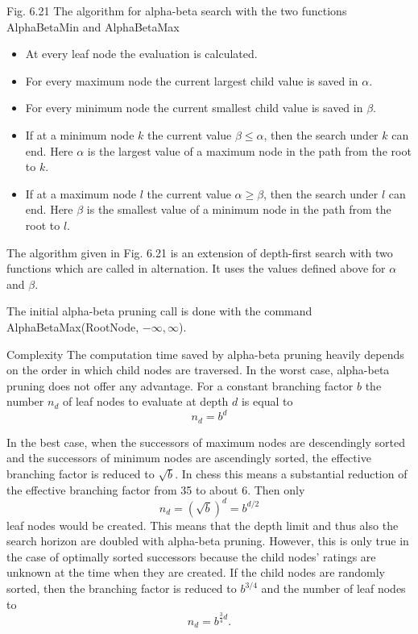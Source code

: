 \documentclass[10pt]{book}
\begin{document}
Fig. 6.21 The algorithm for alpha-beta search with the two functions AlphaBetaMin and AlphaBetaMax

\begin{itemize}
  \item At every leaf node the evaluation is calculated.
  \item For every maximum node the current largest child value is saved in $\alpha$.
  \item For every minimum node the current smallest child value is saved in $\beta$.
  \item If at a minimum node $k$ the current value $\beta \leq \alpha$, then the search under $k$ can end. Here $\alpha$ is the largest value of a maximum node in the path from the root to $k$.
  \item If at a maximum node $l$ the current value $\alpha \geq \beta$, then the search under $l$ can end. Here $\beta$ is the smallest value of a minimum node in the path from the root to $l$.
\end{itemize}
The algorithm given in Fig. 6.21 is an extension of depth-first search with two functions which are called in alternation. It uses the values defined above for $\alpha$ and $\beta$.

The initial alpha-beta pruning call is done with the command
AlphaBetaMax(RootNode, $-\infty, \infty$).

Complexity The computation time saved by alpha-beta pruning heavily depends on the order in which child nodes are traversed. In the worst case, alpha-beta pruning does not offer any advantage. For a constant branching factor $b$ the number $n_{d}$ of leaf nodes to evaluate at depth $d$ is equal to
$$
n_{d}=b^{d}
$$

In the best case, when the successors of maximum nodes are descendingly sorted and the successors of minimum nodes are ascendingly sorted, the effective branching factor is reduced to $\sqrt{b}$. In chess this means a substantial reduction of the effective branching factor from 35 to about 6. Then only
$$
n_{d}=(\sqrt{b})^{d}=b^{d/2}
$$
leaf nodes would be created. This means that the depth limit and thus also the search horizon are doubled with alpha-beta pruning. However, this is only true in the case of optimally sorted successors because the child nodes' ratings are unknown at the time when they are created. If the child nodes are randomly sorted, then the branching factor is reduced to $b^{3 / 4}$ and the number of leaf nodes to
$$
n_{d}=b^{\frac{3}{4} d}.
$$
\end{document}
